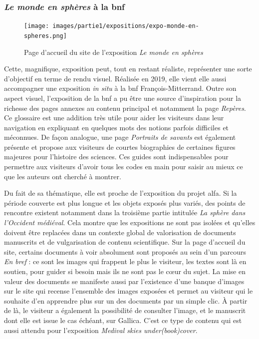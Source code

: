 	\subsubsection{\textit{Le monde en sphères} à la \acrlong{bnf}}
	\begin{figure}[h]
	\caption{Page d'accueil du site de l'exposition \textit{Le monde en sphères}}
	\texttt{[image: images/partie1/expositions/expo-monde-en-spheres.png]}
    \centering
    \end{figure}
	Cette, magnifique, exposition peut,  tout en restant réaliste, représenter une sorte d'objectif en terme de rendu visuel. Réalisée en 2019, elle vient elle aussi accompagner une exposition \textit{in situ} à la \acrshort{bnf} François-Mitterrand. Outre son aspect visuel, l'exposition de la \acrshort{bnf} a pu être une source d'inspiration pour la richesse des pages annexes au contenu principal et notamment la page \textit{Repères}. Ce glossaire est une addition très utile pour aider les visiteurs dans leur navigation en expliquant en quelques mots des notions parfois difficiles et méconnues. De façon analogue, une page \textit{Portraits de savants} est également présente et propose aux visiteurs de courtes biographies de certaines figures majeures pour l'histoire des sciences. Ces guides sont indispensables pour permettre aux visiteurs d'avoir tous les codes en main pour saisir au mieux ce que les auteurs ont cherché à montrer.

	Du fait de sa thématique, elle est proche de l'exposition du projet \acrshort{alfa}. Si la période couverte est plus longue et les objets exposés plus variés, des points de rencontre existent notamment dans la troisième partie intitulée \textit{La sphère dans l'Occident médiéval}. Cela montre que les expositions ne sont pas isolées et qu'elles doivent être replacées dans un contexte global de valorisation de documents manuscrits et de vulgarisation de contenu scientifique. Sur la page d'accueil du site, certains documents à voir absolument sont proposés au sein d'un parcours \textit{En bref} : ce sont les images qui frappent le plus le visiteur, les textes sont là en soutien, pour guider si besoin mais ils ne sont pas le cœur du sujet. La mise en valeur des documents se manifeste aussi par l'existence d'une banque d'images sur le site qui recense l'ensemble des images exposées et permet au visiteur qui le souhaite d'en apprendre plus sur un des documents par un simple clic. À partir de là, le visiteur a également la possibilité de consulter l'image, et le manuscrit dont elle est issue le cas échéant, sur Gallica. C'est ce type de contenu qui est aussi attendu pour l'exposition \textit{Medival skies under(book)cover}.
	
